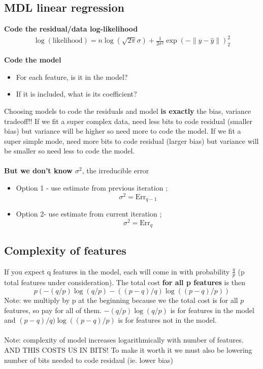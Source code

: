 \documentclass[a4paper]{article}\usepackage[]{graphicx}\usepackage[]{color}
\begin{document}
\subsection{MDL linear regression}

\textbf{Code the residual/data log-likelihood}
\begin{align*}
\log(\text{likelihood}) = n\log(\sqrt{2\pi}\sigma) + \frac{1}{2\sigma^2}\exp(-\lVert y-\hat{y} \rVert)_2^2
\end{align*}

\textbf{Code the model}
\begin{itemize}
\item For each feature, is it in the model?
\item If it is included, what is its coefficient?
\end{itemize}

Choosing models to code the residuals and model \textbf{is exactly} the bias, variance tradeoff!! If we fit a super complex data, need less bits to code residual (smaller bias) but variance will be higher so need more to code the model. If we fit a super simple mode, need more bits to code residual (larger bias) but variance will be smaller so need less to code the model.\\
\\

\textbf{But we don't know $\sigma^2$}, the irreducible error
\begin{itemize}
\item Option 1 - use estimate from previous iteration ;
\begin{equation*} \sigma^2 = \text{Err}_{q-1} \end{equation*}
\item Option 2- use estimate from current iteration ;
\begin{equation*} \sigma^2 = \text{Err}_{q} \end{equation*}
\end{itemize}

\subsection{Complexity of features}

If you expect q features in the model, each will come in with probability $\frac{q}{p}$ (p total features under consideration). The total cost \textbf{for all p features} is then
\begin{equation*} p (-(q/p)\log(q/p) - ((p-q)/q)\log((p-q)/p)) \end{equation*}
Note: we multiply by p at the beginning because we the total cost is for all $p$ features, so pay for all of them. $-(q/p)\log(q/p)$ is for features in the model and $(p-q)/q)\log((p-q)/p)$ is for features not in the model. \\
\\
Note: complexity of model increases logarithmically with number of features. AND THIS COSTS US IN BITS! To make it worth it we must also be lowering number of bits needed to code residaul (ie. lower bias) 
\end{document}
